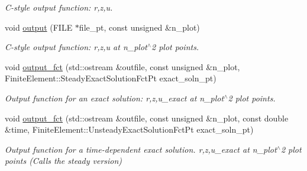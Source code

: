 \begin{DoxyCompactItemize}
\begin{DoxyCompactList}\small\item\em C-\/style output function\+: r,z,u. \end{DoxyCompactList}\item 
void \hyperlink{classQGeneralisedAxisymAdvectionDiffusionElement_a8a4d1085090bd4c1a26f66ba56c1ba91}{output} (F\+I\+LE $\ast$file\+\_\+pt, const unsigned \&n\+\_\+plot)
\begin{DoxyCompactList}\small\item\em C-\/style output function\+: r,z,u at n\+\_\+plot$^\wedge$2 plot points. \end{DoxyCompactList}\item 
void \hyperlink{classQGeneralisedAxisymAdvectionDiffusionElement_a042bcc2a530356ca39490393f011287a}{output\+\_\+fct} (std\+::ostream \&outfile, const unsigned \&n\+\_\+plot, Finite\+Element\+::\+Steady\+Exact\+Solution\+Fct\+Pt exact\+\_\+soln\+\_\+pt)
\begin{DoxyCompactList}\small\item\em Output function for an exact solution\+: r,z,u\+\_\+exact at n\+\_\+plot$^\wedge$2 plot points. \end{DoxyCompactList}\item 
void \hyperlink{classQGeneralisedAxisymAdvectionDiffusionElement_a1f731cce10286e25c409d13bf3354da1}{output\+\_\+fct} (std\+::ostream \&outfile, const unsigned \&n\+\_\+plot, const double \&time, Finite\+Element\+::\+Unsteady\+Exact\+Solution\+Fct\+Pt exact\+\_\+soln\+\_\+pt)
\begin{DoxyCompactList}\small\item\em Output function for a time-\/dependent exact solution. r,z,u\+\_\+exact at n\+\_\+plot$^\wedge$2 plot points (Calls the steady version) \end{DoxyCompactList}\end{DoxyCompactItemize}
